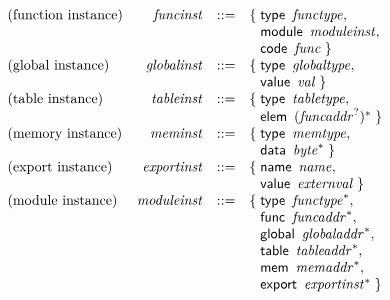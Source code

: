 $$
\begin{array}{@{}lrrl@{}l@{}}
\mbox{(function instance)} & {\mathit{funcinst}} &::=& \{\; \begin{array}[t]{@{}l@{}l@{}}
\mathsf{type}~\,{\mathit{functype}},\; \\
  \mathsf{module}~\,{\mathit{moduleinst}},\; \\
  \mathsf{code}~\,{\mathit{func}} \;\}\end{array} \\
\mbox{(global instance)} & {\mathit{globalinst}} &::=& \{\; \begin{array}[t]{@{}l@{}l@{}}
\mathsf{type}~\,{\mathit{globaltype}},\; \\
  \mathsf{value}~\,{\mathit{val}} \;\}\end{array} \\
\mbox{(table instance)} & {\mathit{tableinst}} &::=& \{\; \begin{array}[t]{@{}l@{}l@{}}
\mathsf{type}~\,{\mathit{tabletype}},\; \\
  \mathsf{elem}~\,{({{\mathit{funcaddr}}^?})^\ast} \;\}\end{array} \\
\mbox{(memory instance)} & {\mathit{meminst}} &::=& \{\; \begin{array}[t]{@{}l@{}l@{}}
\mathsf{type}~\,{\mathit{memtype}},\; \\
  \mathsf{data}~\,{{\mathit{byte}}^\ast} \;\}\end{array} \\
\mbox{(export instance)} & {\mathit{exportinst}} &::=& \{\; \begin{array}[t]{@{}l@{}l@{}}
\mathsf{name}~\,{\mathit{name}},\; \\
  \mathsf{value}~\,{\mathit{externval}} \;\}\end{array} \\
\mbox{(module instance)} & {\mathit{moduleinst}} &::=& \{\; \begin{array}[t]{@{}l@{}l@{}}
\mathsf{type}~\,{{\mathit{functype}}^\ast},\; \\
  \mathsf{func}~\,{{\mathit{funcaddr}}^\ast},\; \\
  \mathsf{global}~\,{{\mathit{globaladdr}}^\ast},\; \\
  \mathsf{table}~\,{{\mathit{tableaddr}}^\ast},\; \\
  \mathsf{mem}~\,{{\mathit{memaddr}}^\ast},\; \\
  \mathsf{export}~\,{{\mathit{exportinst}}^\ast} \;\}\end{array} \\
\end{array}
$$

